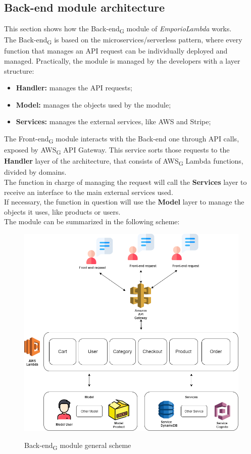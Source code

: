 \subsection{Back-end module architecture}
This section shows how the Back-end\textsubscript{G} module of \textit{EmporioLambda} works. \\The Back-end\textsubscript{G} is based on the microservices/serverless pattern, where every function that manages an API request can be individually deployed and managed. Practically, the module is managed by the developers with a layer structure:
\begin{itemize}
\item \textbf{Handler:} manages the API requests;
\item \textbf{Model:} manages the objects used by the module;
\item \textbf{Services:} manages the external services, like AWS and Stripe;
\end{itemize} 

The Front-end\textsubscript{G} module interacts with the Back-end one through API calls, exposed by AWS\textsubscript{G} API Gateway. This service sorts those requests to the \textbf{Handler} layer of the architecture, that consists of AWS\textsubscript{G} Lambda functions, divided by domains.\\
The function in charge of managing the request will call the \textbf{Services} layer to receive an interface to the main external services used.\\
If necessary, the function in question will use the \textbf{Model} layer to manage the objects it uses, like products or users.\\

The module can be summarized in the following scheme: 

\begin{figure}[H]
\centering
\includegraphics[scale=0.45]{res/Architettura/Backend/img/layerBack-end}\\
\caption{Back-end\textsubscript{G} module general scheme}
\end{figure}

